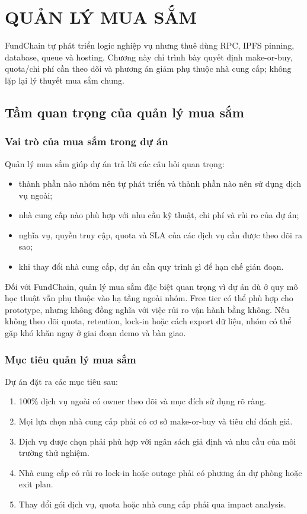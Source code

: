 \chapter{QUẢN LÝ MUA SẮM}

FundChain tự phát triển logic nghiệp vụ nhưng thuê dùng RPC, IPFS pinning, database, queue và hosting. Chương này chỉ trình bày quyết định make-or-buy, quota/chi phí cần theo dõi và phương án giảm phụ thuộc nhà cung cấp; không lặp lại lý thuyết mua sắm chung.

\iffalse
\section{Tầm quan trọng của quản lý mua sắm}

\subsection{Vai trò của mua sắm trong dự án}

Quản lý mua sắm giúp dự án trả lời các câu hỏi quan trọng:

\begin{itemize}
  \item thành phần nào nhóm nên tự phát triển và thành phần nào nên sử dụng dịch vụ ngoài;
  \item nhà cung cấp nào phù hợp với nhu cầu kỹ thuật, chi phí và rủi ro của dự án;
  \item nghĩa vụ, quyền truy cập, quota và SLA của các dịch vụ cần được theo dõi ra sao;
  \item khi thay đổi nhà cung cấp, dự án cần quy trình gì để hạn chế gián đoạn.
\end{itemize}

Đối với FundChain, quản lý mua sắm đặc biệt quan trọng vì dự án dù ở quy mô học thuật vẫn phụ thuộc vào hạ tầng ngoài nhóm. Free tier có thể phù hợp cho prototype, nhưng không đồng nghĩa với việc rủi ro vận hành bằng không. Nếu không theo dõi quota, retention, lock-in hoặc cách export dữ liệu, nhóm có thể gặp khó khăn ngay ở giai đoạn demo và bàn giao.

\subsection{Mục tiêu quản lý mua sắm}

Dự án đặt ra các mục tiêu sau:

\begin{enumerate}
  \item 100\% dịch vụ ngoài có owner theo dõi và mục đích sử dụng rõ ràng.
  \item Mọi lựa chọn nhà cung cấp phải có cơ sở make-or-buy và tiêu chí đánh giá.
  \item Dịch vụ được chọn phải phù hợp với ngân sách giả định và nhu cầu của môi trường thử nghiệm.
  \item Nhà cung cấp có rủi ro lock-in hoặc outage phải có phương án dự phòng hoặc exit plan.
  \item Thay đổi gói dịch vụ, quota hoặc nhà cung cấp phải qua impact analysis.
\end{enumerate}

